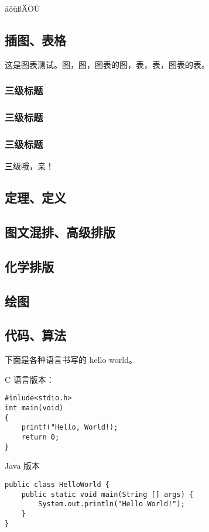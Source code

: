 \documentclass[%
               print, 
              ]{xjtubsc}
\begin{document}
äöüßÄÖÜ

\subsection{插图、表格}
这是图表测试。图，图，图表的图，表，表，图表的表。
\subsubsection{三级标题}
\subsubsection{三级标题}
\subsubsection{三级标题}
三级哦，亲！

\subsection{定理、定义}

\subsection{图文混排、高级排版}

\subsection{化学排版}


\subsection{绘图}

\subsection{代码、算法}

下面是各种语言书写的 hello world。

C 语言版本：
\begin{verbatim}
#inlude<stdio.h>
int main(void)	
{
    printf("Hello, World!);
    return 0;
}
\end{verbatim}

Java 版本
\begin{verbatim}
public class HelloWorld {
    public static void main(String [] args) {
        System.out.println("Hello World!");
    }
}
\end{verbatim}
\end{document}
